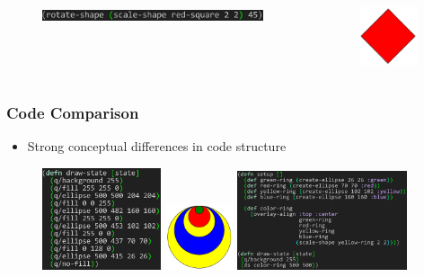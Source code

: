 \documentclass{beamer}
\begin{document}
\begin{frame}[fragile]
\begin{itemize}
		\begin{columns}[t]
		\begin{column}{.45\textwidth}
			\begin{figure}[h]
			\vspace{-0.5cm}
			\includegraphics[width=6.5cm]{PresentationImages/rotateAndScaleRedCode.png}
			\end{figure}
		\end{column}
		\begin{column}{.3\textwidth}
			\begin{figure}[h]
			\includegraphics[width=1.7cm]{PresentationImages/red-rectangle-scale-rotate.png}
			\end{figure}		
		\end{column}
		\end{columns}
	\end{itemize}
\end{frame}

\begin{frame}
\frametitle{Code Comparison}
	\begin{itemize}
		\item Strong conceptual differences in code structure
	\end{itemize}
	\begin{figure}
	\hspace{-0.4cm}
	\includegraphics[width=3.5cm]{PresentationImages/theirRingsCode.png}
	\hspace{0.1cm}
	\includegraphics[width=2cm]{PresentationImages/rings.png}
	\hspace{0.1cm}
	\includegraphics[width=5cm]{PresentationImages/ourRingsCode.png}
	\end{figure}
\end{frame}
\end{document}
